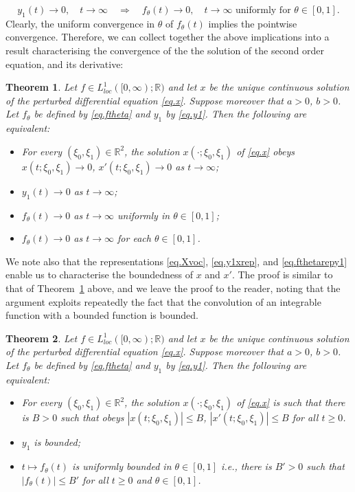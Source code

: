 \documentclass[10pt,reqno]{amsart}
\newtheorem{theorem}{Theorem}
\theoremstyle{definition}
\begin{document}
	\[
	y_1(t)\to 0, \quad t\to\infty \quad  \Longrightarrow \quad  f_\theta(t)\to 0, \quad t\to\infty \text{ uniformly for $\theta\in [0,1]$}.
	\]
	Clearly, the uniform convergence in $\theta$ of $f_\theta(t)$ implies the pointwise convergence. Therefore, we can collect together the above implications  into a result characterising the convergence of the the solution of the second order equation, and its derivative:
	\begin{theorem} \label{thm.xxprintf} 
		Let $f\in L^1_{loc}([0,\infty);\mathbb{R})$ and let $x$ be the unique continuous solution of the perturbed differential equation \eqref{eq.x}. Suppose moreover that $a>0$, $b>0$. Let $f_\theta$ be defined by \eqref{eq.ftheta} and $y_1$ by \eqref{eq.y1}. Then the following are equivalent:
		\begin{itemize}
			\item[(i)] For every $(\xi_0,\xi_1)\in \mathbb{R}^2$, the solution $x(\cdot;\xi_0,\xi_1)$ of \eqref{eq.x} obeys $x(t;\xi_0,\xi_1)\to 0$, $x'(t;\xi_0,\xi_1)\to 0$ as $t\to\infty$;
			\item[(ii)] $y_1(t)\to 0$ as $t\to\infty$; 
			\item[(iii)] $f_\theta (t)\to 0$ as $t\to\infty$ uniformly in $\theta\in [0,1]$;
			\item[(iv)]  $f_\theta(t)\to 0$ as $t\to\infty$ for each  $\theta\in [0,1]$.
		\end{itemize}
	\end{theorem}
	We note also that the representations \eqref{eq.Xvoc}, \eqref{eq.y1xrep}, and \eqref{eq.fthetarepy1} enable us to characterise the boundedness of $x$ and $x'$. The proof is similar to that of Theorem~\ref{thm.xxprintf} above, and we leave the proof to the reader, noting that the argument exploits repeatedly the fact that the convolution of an integrable function with a bounded function is bounded. 
		\begin{theorem} \label{thm.xxprintfbdd} 
		Let $f\in L^1_{loc}([0,\infty);\mathbb{R})$ and let $x$ be the unique continuous solution of the perturbed differential equation \eqref{eq.x}. Suppose moreover that $a>0$, $b>0$. Let $f_\theta$ be defined by \eqref{eq.ftheta} and $y_1$ by \eqref{eq.y1}. Then the following are equivalent:
		\begin{itemize}
			\item[(i)] For every $(\xi_0,\xi_1)\in \mathbb{R}^2$, the solution $x(\cdot;\xi_0,\xi_1)$ of \eqref{eq.x} is such that there is $B>0$ such that obeys $|x(t;\xi_0,\xi_1)|\leq B$,   $|x'(t;\xi_0,\xi_1)|\leq B$ for all $t\geq 0$. 
			\item[(ii)] $y_1$ is bounded; 
			\item[(iii)] $t\mapsto f_\theta (t)$ is uniformly bounded in $\theta\in [0,1]$ i.e., there is $B'>0$ such that $|f_\theta(t)|\leq B'$ for all $t\geq 0$ and $\theta\in [0,1]$.
		\end{itemize}
	\end{theorem}
	
\end{document}
